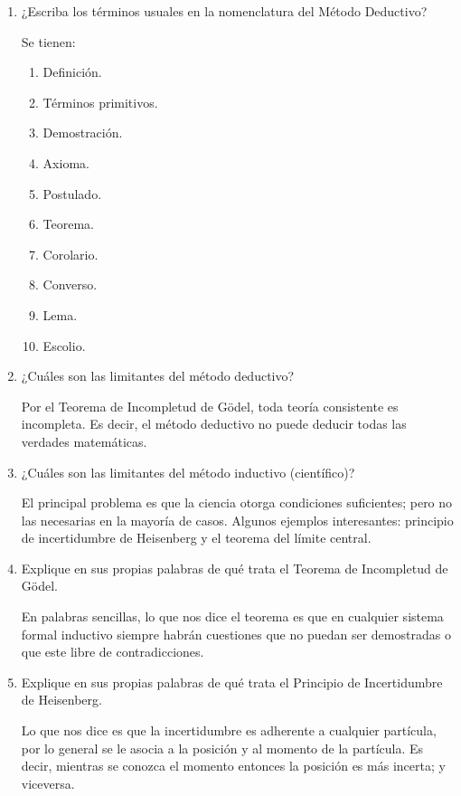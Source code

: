 \begin{enumerate}
	\item ¿Escriba los términos usuales en la nomenclatura del Método Deductivo?
	\begin{sol} Se tienen:
	\begin{enumerate}
		\item Definición.
		\item Términos primitivos. 
		\item Demostración.
		\item Axioma.
		\item Postulado. 
		\item Teorema. 
		\item Corolario.
		\item Converso.
		\item Lema.
		\item Escolio.
	\end{enumerate}
\end{sol}
	
	\item ¿Cuáles son las limitantes del método deductivo?
	\begin{sol}
		Por el Teorema de Incompletud de Gödel, toda teoría consistente es incompleta. Es decir, el método deductivo no puede deducir todas las verdades matemáticas. 
	\end{sol}
	
	\item ¿Cuáles son las limitantes del método inductivo (científico)?
	\begin{sol}
		El principal problema es que la ciencia otorga condiciones suficientes; pero no las necesarias en la mayoría de casos. Algunos ejemplos interesantes: principio de incertidumbre de Heisenberg y el teorema del límite central. 
	\end{sol}
	
	\item Explique en sus propias palabras de qué trata el Teorema de Incompletud de Gödel.
	
	\begin{sol}
		En palabras sencillas, lo que nos dice el teorema es que en cualquier sistema formal inductivo siempre habrán cuestiones que no puedan ser demostradas o que este libre de contradicciones.
	\end{sol}
	\item Explique en sus propias palabras de qué trata el Principio de Incertidumbre de Heisenberg.
	\begin{sol}
		Lo que nos dice es que la incertidumbre es adherente a cualquier partícula, por lo general se le asocia a la posición y al momento de la partícula. Es decir, mientras se conozca el momento entonces la posición es más incerta; y viceversa. 
	\end{sol}
	

\end{enumerate}
